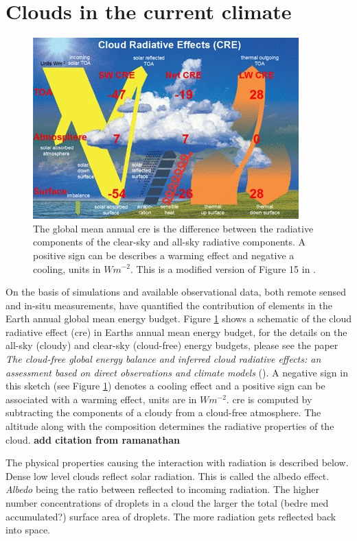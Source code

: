 \section{Clouds in the current climate} \label{sec:intro_cloud_current_climate}
\begin{figure}[h]
    \centering
    \includegraphics[scale = 7]{Chapter1_Intro/images/CRE_wild2019.jpg}
    \caption{The global mean annual \acrfull{cre} is the difference between the radiative components of the clear-sky and all-sky radiative components. A positive sign can be describes a warming effect and negative a cooling, units in $W m^{-2}$. This is a modified version of Figure 15 in \cite{Wild2019TheModels}.
    }
    \label{fig:cre}
\end{figure}
On the basis of simulations and available observational data, both remote sensed and in-situ measurements,  \citeauthor{Wild2019TheModels} have quantified the contribution of elements in the Earth annual global mean energy budget. Figure \ref{fig:cre} shows a schematic of the cloud radiative effect (\acrshort{cre}) in Earths annual mean energy budget, for the details on the all-sky (cloudy) and clear-sky (cloud-free) energy budgets, please see the paper \textit{The cloud-free global energy balance and inferred cloud radiative effects: an assessment based on direct observations and climate models} (\cite{Wild2019TheModels}). A negative sign in this sketch (see Figure \ref{fig:cre}) denotes a cooling effect and a positive sign can be associated with a warming effect, units are in $W m^{-2}$. \acrshort{cre} is computed by subtracting the components of a cloudy from a cloud-free atmosphere. The altitude along with the composition determines the radiative properties of the cloud. \textbf{add citation from ramanathan }

The physical properties causing the interaction with radiation is described below. Dense low level clouds reflect solar radiation. This is called the albedo effect. \textit{Albedo} being the ratio between reflected to incoming radiation. The higher number concentrations of droplets in a cloud the larger the total (bedre med accumulated?) surface area of droplets. The more radiation gets reflected back into space. 

